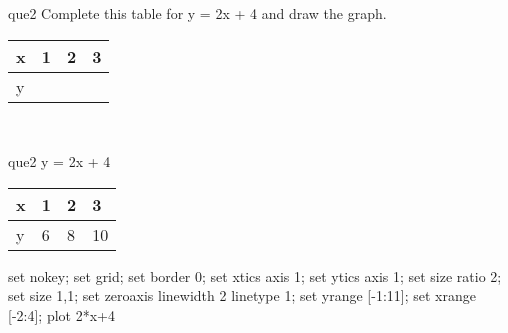 \documentclass[13.5pt, varwidth=true]{beamer}
\begin{document}
\begin{frame}[shrink=19,fragile]
	\begin{beamercolorbox}[rounded=true, left, shadow=true,wd=14.8cm]{que2}
		 Complete this table for y = 2x + 4 and draw the graph. \\[0.3cm] \renewcommand{\arraystretch}{1.2}\begin{tabular}{|C|C|C|C|} \hline x & 1 & 2 & 3 \\ \hline y & & & \\ \hline \end{tabular}\\[0.3cm]
	\end{beamercolorbox}
\end{frame}
\begin{frame}[shrink=19,fragile]
	\begin{beamercolorbox}[rounded=true, left, shadow=true,wd=14.8cm]{que2}
		y = 2x + 4\renewcommand{\arraystretch}{1.2}\begin{tabular}{|C|C|C|C|} \hline x & 1 & 2 & 3 \\ \hline y & 6 & 8 & 10\\ \hline \end{tabular}\begin{gnuplot}[terminal=pdf] set nokey; set grid; set border 0; set xtics axis 1; set ytics axis 1; set size ratio 2; set size 1,1; set zeroaxis linewidth 2 linetype 1; set yrange [-1:11]; set xrange [-2:4]; plot 2*x+4 \end{gnuplot}
	\end{beamercolorbox}
\end{frame}
\end{document}
